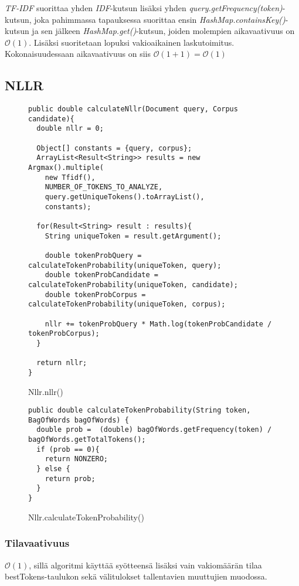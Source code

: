 \documentclass[12pt,a4paper]{article}
\begin{document}
\textit{TF-IDF} suorittaa yhden \textit{IDF}-kutsun lisäksi yhden \textit{query.getFrequency(token)}-kutsun, joka pahimmassa tapauksessa suorittaa ensin \textit{HashMap.containsKey()}-kutsun ja sen jälkeen \textit{HashMap.get()}-kutsun, joiden molempien aikavaativuus on $\mathcal{O}(1)$. Lisäksi suoritetaan lopuksi vakioaikainen laskutoimitus. Kokonaisuudessaan aikavaativuus on siis $\mathcal{O}(1+1) = \mathcal{O}(1)$


\subsection{NLLR}

\begin{figure}[H]
\begin{lstlisting}
public double calculateNllr(Document query, Corpus candidate){       
  double nllr = 0;
        
  Object[] constants = {query, corpus};
  ArrayList<Result<String>> results = new Argmax().multiple(
    new Tfidf(),
    NUMBER_OF_TOKENS_TO_ANALYZE,
    query.getUniqueTokens().toArrayList(),
    constants);

  for(Result<String> result : results){
    String uniqueToken = result.getArgument();

    double tokenProbQuery = calculateTokenProbability(uniqueToken, query);
    double tokenProbCandidate = calculateTokenProbability(uniqueToken, candidate);
    double tokenProbCorpus = calculateTokenProbability(uniqueToken, corpus);

    nllr += tokenProbQuery * Math.log(tokenProbCandidate / tokenProbCorpus);
  }
        
  return nllr;
}
\end{lstlisting}
\caption{Nllr.nllr()}
\end{figure}

\begin{figure}[H]
\begin{lstlisting}
public double calculateTokenProbability(String token, BagOfWords bagOfWords) {
  double prob =  (double) bagOfWords.getFrequency(token) / bagOfWords.getTotalTokens();
  if (prob == 0){
    return NONZERO;
  } else {
    return prob;
  }
}
\end{lstlisting}
\caption{Nllr.calculateTokenProbability()}
\end{figure}

\subsubsection*{Tilavaativuus}
$\mathcal{O}(1)$, sillä algoritmi käyttää syötteensä lisäksi vain vakiomäärän tilaa bestTokens-taulukon sekä välitulokset tallentavien muuttujien muodossa.
\end{document}
